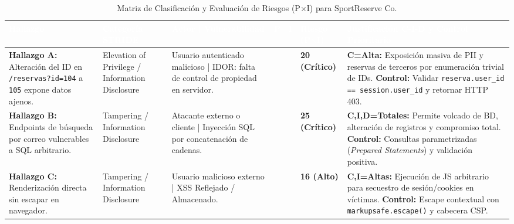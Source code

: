 \documentclass[12pt,a4paper]{article}
\begin{document}
\begin{table}[H]
\centering
\caption{Matriz de Clasificación y Evaluación de Riesgos (P$\times$I) para SportReserve Co.}
\label{tab:matriz_sportreserve}
\begin{tabularx}{\textwidth}{>{\raggedright\arraybackslash}p{3.0cm} >{\raggedright\arraybackslash}p{2.3cm} >{\raggedright\arraybackslash}p{2.7cm} >{\centering\arraybackslash}p{0.7cm} >{\centering\arraybackslash}p{0.7cm} >{\centering\arraybackslash}p{1.5cm} >{\raggedright\arraybackslash}X}
\hline
\rowcolor{unsaacMaroon} \textcolor{white}{\textbf{Hallazgo}} & \textcolor{white}{\textbf{Categoría STRIDE}} & \textcolor{white}{\textbf{Actor | Vulnerabilidad}} & \textcolor{white}{\textbf{P}} & \textcolor{white}{\textbf{I}} & \textcolor{white}{\textbf{Riesgo (P$\times$I)}} & \textcolor{white}{\textbf{Justificación C-I-D y Control Prioritario}} \\
\hline
\textbf{Hallazgo A:} Alteración del ID en \texttt{/reservas?id=104} a \texttt{105} expone datos ajenos. & Elevation of Privilege / Information Disclosure & Usuario autenticado malicioso | IDOR: falta de control de propiedad en servidor. & 4 & 5 & \textbf{20 (Crítico)} & \textbf{C=Alta:} Exposición masiva de PII y reservas de terceros por enumeración trivial de IDs. \textbf{Control:} Validar \texttt{reserva.user\_id == session.user\_id} y retornar HTTP 403. \\
\hline
\rowcolor{rowAlt} \textbf{Hallazgo B:} Endpoints de búsqueda por correo vulnerables a SQL arbitrario. & Tampering / Information Disclosure & Atacante externo o cliente | Inyección SQL por concatenación de cadenas. & 5 & 5 & \textbf{25 (Crítico)} & \textbf{C,I,D=Totales:} Permite volcado de BD, alteración de registros y compromiso total. \textbf{Control:} Consultas parametrizadas (\textit{Prepared Statements}) y validación positiva. \\
\hline
\textbf{Hallazgo C:} Renderización directa sin escapar en navegador. & Tampering / Information Disclosure & Usuario malicioso externo | XSS Reflejado / Almacenado. & 4 & 4 & \textbf{16 (Alto)} & \textbf{C,I=Altas:} Ejecución de JS arbitrario para secuestro de sesión/cookies en víctimas. \textbf{Control:} Escape contextual con \texttt{markupsafe.escape()} y cabecera CSP. \\
\hline
\end{tabularx}
\end{table}

\end{document}

